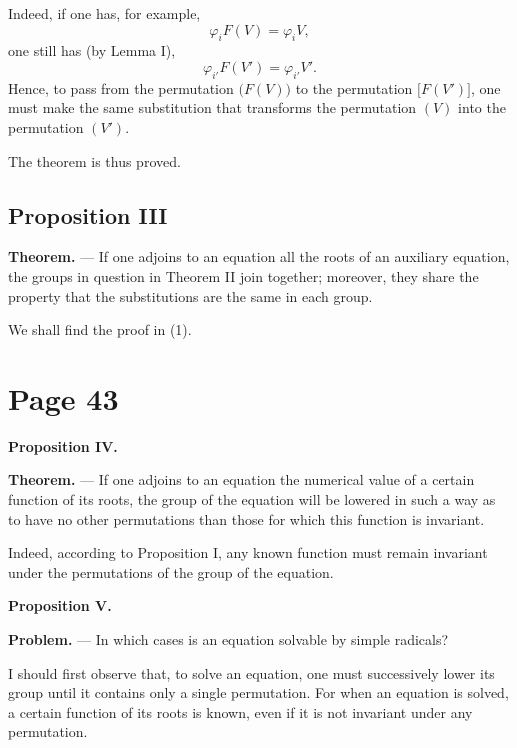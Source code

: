 \documentclass{article}
\begin{document}
Indeed, if one has, for example,
\[
\varphi_{i} F(V) = \varphi_{i} V,
\]
one still has (by Lemma I),
\[
\varphi_{i'} F(V') = \varphi_{i'} V'.
\]
Hence, to pass from the permutation $\bigl(F(V)\bigr)$ to the permutation $\bigl[F(V')\bigr]$, one must make the same substitution that transforms the permutation $(V)$ into the permutation $(V')$.

The theorem is thus proved.

\subsection*{Proposition III}

\textbf{Theorem.} --- If one adjoins to an equation all the roots of an auxiliary equation, the groups in question in Theorem II join together; moreover, they share the property that the substitutions are the same in each group.

We shall find the proof in (1).


\section*{Page 43}

\textbf{Proposition IV.}

\textbf{Theorem.} --- If one adjoins to an equation the numerical value of a certain function of its roots, the group of the equation will be lowered in such a way as to have no other permutations than those for which this function is invariant.

Indeed, according to Proposition I, any known function must remain invariant under the permutations of the group of the equation.

\textbf{Proposition V.}

\textbf{Problem.} --- In which cases is an equation solvable by simple radicals?

I should first observe that, to solve an equation, one must successively lower its group until it contains only a single permutation. For when an equation is solved, a certain function of its roots is known, even if it is not invariant under any permutation.
\end{document}
